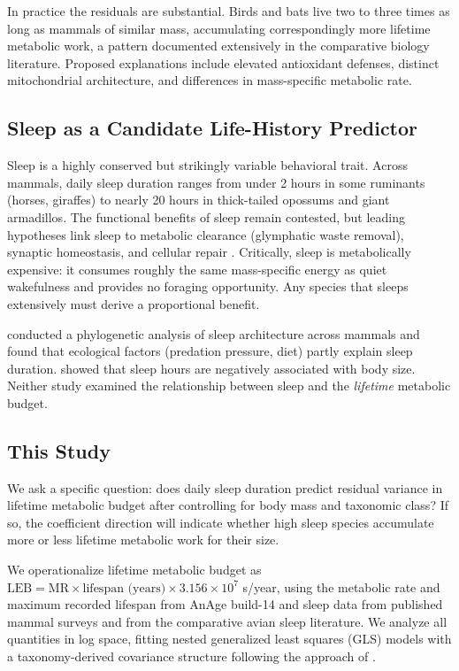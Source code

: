\documentclass{article}
\begin{document}
In practice the residuals are substantial. Birds and bats live two to three times as
long as mammals of similar mass, accumulating correspondingly more lifetime metabolic
work, a pattern documented extensively in the comparative biology literature. Proposed
explanations include elevated antioxidant defenses, distinct mitochondrial architecture,
and differences in mass-specific metabolic rate.

\subsection{Sleep as a Candidate Life-History Predictor}

Sleep is a highly conserved but strikingly variable behavioral trait. Across mammals,
daily sleep duration ranges from under 2 hours in some ruminants (horses, giraffes)
to nearly 20 hours in thick-tailed opossums and giant armadillos. The functional
benefits of sleep remain contested, but leading hypotheses link sleep to metabolic
clearance (glymphatic waste removal), synaptic homeostasis, and cellular repair
\citep{siegel2005}. Critically, sleep is metabolically expensive: it consumes roughly
the same mass-specific energy as quiet wakefulness and provides no foraging opportunity.
Any species that sleeps extensively must derive a proportional benefit.

\citet{lesku2006} conducted a phylogenetic analysis of sleep architecture across mammals
and found that ecological factors (predation pressure, diet) partly explain sleep
duration. \citet{allison1976} showed that sleep hours are negatively associated with
body size. Neither study examined the relationship between sleep and the
\emph{lifetime} metabolic budget.

\subsection{This Study}

We ask a specific question: does daily sleep duration predict residual variance in
lifetime metabolic budget after controlling for body mass and taxonomic class? If so,
the coefficient direction will indicate whether high sleep species accumulate more or
less lifetime metabolic work for their size.

We operationalize lifetime metabolic budget as $\text{LEB} = \text{MR} \times
\text{lifespan (years)} \times 3.156 \times 10^7$ s/year, using the metabolic rate
and maximum recorded lifespan from AnAge build-14 \citep{demagalhaes2009} and sleep
data from published mammal surveys \citep{allison1976} and from the comparative avian
sleep literature. We analyze all quantities in log space, fitting nested generalized
least squares (GLS) models with a taxonomy-derived covariance structure following the
approach of \citet{felsenstein1985}.
\end{document}
